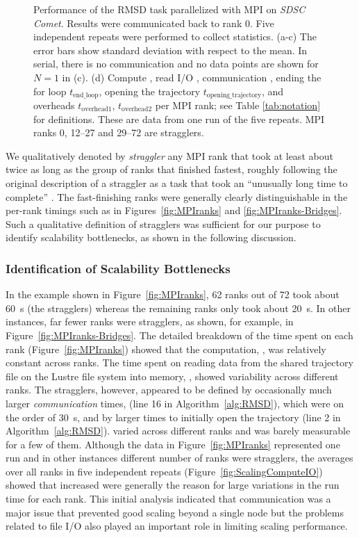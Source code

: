 \begin{figure}[!htb]
  \caption{Performance of the RMSD task parallelized with MPI on \emph{SDSC Comet}.
    Results were communicated back to rank 0.
    Five independent repeats were performed to collect statistics.
    (a-c) The error bars show standard deviation with respect to the mean.
    In serial, there is no communication and no data points are shown for $N=1$ in (c).
    (d) Compute \tcomp, read I/O \tIO, communication \tcomm, ending the for loop $t_{\text{end\_loop}}$, opening the trajectory $t_{\text{opening\_trajectory}}$, and overheads $t_{\text{overhead1}}$, $t_{\text{overhead2}}$ per MPI rank; see Table \ref{tab:notation} for definitions.
    These are data from one run of the five repeats.
    MPI ranks 0, 12--27 and 29--72 are stragglers.
  }
  \label{fig:MPIwithIO}
\end{figure}

We qualitatively denoted by \emph{straggler} any MPI rank that took at least about twice as long as the group of ranks that finished fastest, roughly following the original description of a straggler as a task that took an ``unusually long time to complete'' \cite{Dean2004}.
The fast-finishing ranks were generally clearly distinguishable in the per-rank timings such as in Figures~\ref{fig:MPIranks} and \ref{fig:MPIranks-Bridges}.
Such a qualitative definition of stragglers was sufficient for our purpose to identify scalability bottlenecks, as shown in the following discussion.

\subsubsection*{Identification of Scalability Bottlenecks}

In the example shown in Figure~\ref{fig:MPIranks}, 62 ranks out of 72 took about 60~s (the stragglers) whereas the remaining ranks only took about 20~s.
In other instances, far fewer ranks were stragglers, as shown, for example, in Figure~\ref{fig:MPIranks-Bridges}.
The detailed breakdown of the time spent on each rank (Figure~\ref{fig:MPIranks}) showed that the computation, \tcomp, was relatively constant across ranks. 
The time spent on reading data from the shared trajectory file on the Lustre file system into memory, \tIO, showed variability across different ranks. 
The stragglers, however, appeared to be defined by occasionally much larger \emph{communication} times, \tcomm (line 16 in Algorithm~\ref{alg:RMSD}), which were on the order of 30~s, and by larger times to initially open the trajectory (line 2 in Algorithm~\ref{alg:RMSD}).
\tcomm varied across different ranks and was barely measurable for a few of them.
Although the data in Figure~\ref{fig:MPIranks} represented one run and in other instances different number of ranks were stragglers, the averages over all ranks in five independent repeats (Figure~\ref{fig:ScalingComputeIO}) showed that increased \tcomm were generally the reason for large variations in the run time for each rank.
This initial analysis indicated that communication was a major issue that prevented good scaling beyond a single node but the problems related to file I/O also played an important role in limiting scaling performance.


